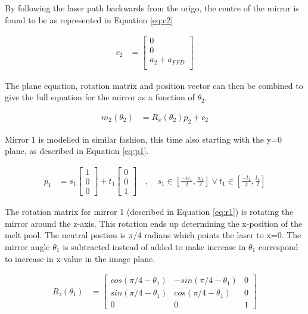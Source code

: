 By following the laser path backwards from the origo, the centre of the mirror is found to be as represented in Equation \ref{eq:c2}

\begin{align}
    c_{2} &=
    \begin{bmatrix}
        0 \\
        0 \\
        a_{2} + a_{FFD} \\
    \end{bmatrix}
    \label{eq:c2}
\end{align}

The plane equation, rotation matrix and position vector can then be combined to give the full equation for the mirror as a function of $\theta_2$. 

\begin{align}
    m_{2}(\theta_2) &= R_{x}(\theta_2) p_{2} + c_{2}
\end{align}

Mirror 1 is modelled in similar fashion, this time also starting with the y=0 plane, as described in Equation \ref{eq:p1}.

\begin{align}
    p_{1} &=
    s_1
    \begin{bmatrix}
        1 \\
        0 \\
        0 
    \end{bmatrix}
    +
    t_1
    \begin{bmatrix}
        0 \\
        0 \\
        1 
    \end{bmatrix}
    \quad , \quad
    s_1 \in \left[\frac{-w_1}{2}, \frac{w_1}{2}\right] \vee 
    t_1 \in \left[\frac{-l_1}{2}, \frac{l_1}{2}\right]
    \label{eq:p1}
\end{align}

The rotation matrix for mirror 1 (described in Equation \ref{eq:r1}) is rotating the mirror around the z-axis. This rotation ends up determining the x-position of the melt pool. The neutral postion is $\pi/4$ radians which points the laser to x=0. The mirror angle $\theta_1$ is subtracted instead of added to make increase in $\theta_1$ correspond to increase in x-value in the image plane.

\begin{align}
    R_{z}(\theta_1) &=
    \begin{bmatrix}
        cos(\pi/4 - \theta_1)   & -sin(\pi/4 - \theta_1)& 0             \\
        sin(\pi/4 - \theta_1)   & cos(\pi/4 - \theta_1) & 0             \\
        0                       & 0                     & 1 
    \end{bmatrix}
    \label{eq:r1}
\end{align}

